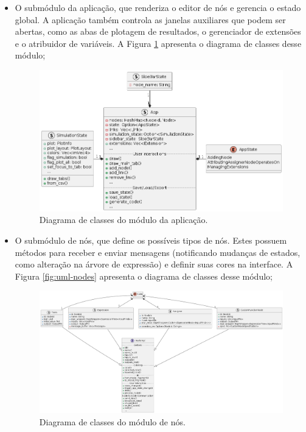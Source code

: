 \documentclass[
	12pt,				%
	openright,			%
	oneside,			%
	a4paper,			%
	main=brazil,
	english,			%
	]{ufsj-abntex2}
\begin{document}
\begin{itemize}
    \item O submódulo da aplicação, que renderiza o editor de nós e gerencia o estado global. A aplicação também controla as janelas auxiliares que podem ser abertas, como as abas de plotagem de resultados, o gerenciador de extensões e o atribuidor de variáveis. A Figura \ref{fig:uml-app} apresenta o diagrama de classes desse módulo;
    \begin{figure}[h]
        \centering
        \includegraphics[scale=0.5]{diagrams/img/app.png} 
        \caption{Diagrama de classes do módulo da aplicação.}
        \label{fig:uml-app}
    \end{figure}
    \item O submódulo de nós, que define os possíveis tipos de nós. Estes possuem métodos para receber e enviar mensagens (notificando mudanças de estados, como alteração na árvore de expressão) e definir suas cores na interface. A Figura \ref{fig:uml-nodes} apresenta o diagrama de classes desse módulo;
    \begin{figure}[h]
        \centering
        \includegraphics[scale=0.3]{diagrams/img/nodes.png} 
        \caption{Diagrama de classes do módulo de nós.}

\end{figure}
\end{itemize}
\end{document}
